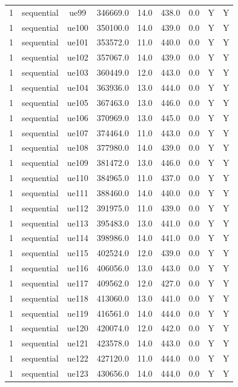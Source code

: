\begin{table}[ht]
\begin{tabular}{|c|c|c|c|c|c|c|c|c|}
1 & sequential & ue99 & 346669.0 & 14.0 & 438.0 & 0.0 & Y & Y \\
1 & sequential & ue100 & 350100.0 & 14.0 & 439.0 & 0.0 & Y & Y \\
1 & sequential & ue101 & 353572.0 & 11.0 & 440.0 & 0.0 & Y & Y \\
1 & sequential & ue102 & 357067.0 & 14.0 & 439.0 & 0.0 & Y & Y \\
1 & sequential & ue103 & 360449.0 & 12.0 & 443.0 & 0.0 & Y & Y \\
1 & sequential & ue104 & 363936.0 & 13.0 & 444.0 & 0.0 & Y & Y \\
1 & sequential & ue105 & 367463.0 & 13.0 & 446.0 & 0.0 & Y & Y \\
1 & sequential & ue106 & 370969.0 & 13.0 & 445.0 & 0.0 & Y & Y \\
1 & sequential & ue107 & 374464.0 & 11.0 & 443.0 & 0.0 & Y & Y \\
1 & sequential & ue108 & 377980.0 & 14.0 & 439.0 & 0.0 & Y & Y \\
1 & sequential & ue109 & 381472.0 & 13.0 & 446.0 & 0.0 & Y & Y \\
1 & sequential & ue110 & 384965.0 & 11.0 & 437.0 & 0.0 & Y & Y \\
1 & sequential & ue111 & 388460.0 & 14.0 & 440.0 & 0.0 & Y & Y \\
1 & sequential & ue112 & 391975.0 & 11.0 & 439.0 & 0.0 & Y & Y \\
1 & sequential & ue113 & 395483.0 & 13.0 & 441.0 & 0.0 & Y & Y \\
1 & sequential & ue114 & 398986.0 & 14.0 & 441.0 & 0.0 & Y & Y \\
1 & sequential & ue115 & 402524.0 & 12.0 & 439.0 & 0.0 & Y & Y \\
1 & sequential & ue116 & 406056.0 & 13.0 & 443.0 & 0.0 & Y & Y \\
1 & sequential & ue117 & 409562.0 & 12.0 & 427.0 & 0.0 & Y & Y \\
1 & sequential & ue118 & 413060.0 & 13.0 & 441.0 & 0.0 & Y & Y \\
1 & sequential & ue119 & 416561.0 & 14.0 & 444.0 & 0.0 & Y & Y \\
1 & sequential & ue120 & 420074.0 & 12.0 & 442.0 & 0.0 & Y & Y \\
1 & sequential & ue121 & 423578.0 & 14.0 & 443.0 & 0.0 & Y & Y \\
1 & sequential & ue122 & 427120.0 & 11.0 & 444.0 & 0.0 & Y & Y \\
1 & sequential & ue123 & 430656.0 & 14.0 & 444.0 & 0.0 & Y & Y \\

\end{tabular}
\end{table}
